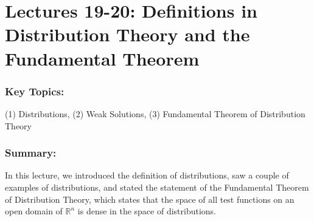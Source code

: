 \documentclass{article}
\begin{document}
\newpage 


\section{Lectures 19-20: Definitions in Distribution Theory and the Fundamental Theorem}
\subsubsection{Key Topics:} (1) Distributions, (2) Weak Solutions, (3) Fundamental Theorem of Distribution Theory 

\subsubsection{Summary:} In this lecture, we introduced the definition of distributions, saw a couple of examples of distributions, and stated the statement of the Fundamental Theorem of Distribution Theory, which states that the space of all test functions on an open domain of $\mathbb{R}^{n}$ is dense in the space of distributions. 
\end{document}
